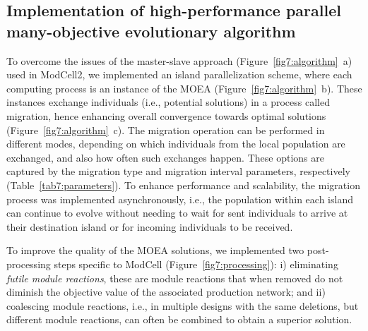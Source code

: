 {\subsection{Implementation of high-performance parallel many-objective evolutionary algorithm}

%

To overcome the issues of the master-slave approach (Figure~\ref{fig7:algorithm}~a) used in ModCell2,\citep{garcia2019} we implemented an island parallelization scheme,\citep{alba2013} where each computing process is an instance of the MOEA (Figure~\ref{fig7:algorithm}~b).
These instances exchange individuals (i.e., potential solutions) in a process called migration, hence enhancing overall convergence towards optimal solutions (Figure~\ref{fig7:algorithm}~c).
The migration operation can be performed in different modes, depending on which individuals from the local population are exchanged, and also how often such exchanges happen.
These options are captured by the migration type and migration interval parameters, respectively (Table~\ref{tab7:parameters}).
To enhance performance and scalability, the migration process was implemented asynchronously, i.e., the population within each island can continue to evolve without needing to wait for sent individuals to arrive at their destination island or for incoming individuals to be received.

To improve the quality of the MOEA solutions, we implemented two post-processing steps specific to ModCell (Figure~\ref{fig7:processing}): i) eliminating \emph{futile module reactions}, these are module reactions that when removed do not diminish the objective value of the associated production network; and ii) coalescing module reactions, i.e., in multiple designs with the same deletions, but different module reactions, can often be combined to obtain a superior solution.

}

